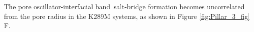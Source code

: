 \documentclass[journal=jacsat,manuscript=article]{achemso}
\newcommand{\fivering}{interfacial band~}
\newcommand{\fiveringnos}{interfacial band}
\newcommand{\triad}{pore oscillator~}
\newcommand{\triadns}{pore oscillator}
\newcommand{\WT}{WT\xspace}
\newcommand{\MT}{K289M\xspace}
\begin{document}

The \triadns-\fivering salt-bridge formation becomes uncorrelated from the pore radius in the \MT systems, as shown in Figure \ref{fig:Pillar_3_fig} F.  
\end{document}

